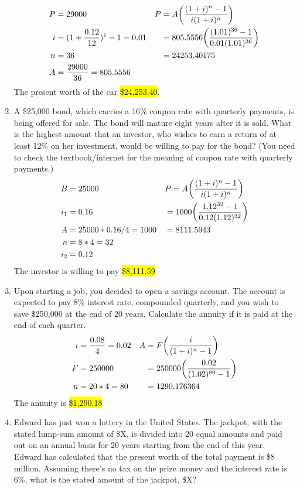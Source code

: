 \documentclass[12pt]{article}
\newcommand{\hilight}[1]{\colorbox{yellow}{#1}}
\begin{document}
\begin{enumerate}[label=\textbf{Q\arabic*}]
\begin{align*}
P &= 29000 &\vspace{20pt} P &= A\bigg (\frac{(1+i)^n-1}{i(1+i)^n}\bigg )\\
i &= (1+\frac{0.12}{12})^1 - 1= 0.01 & &= 805.5556\bigg ( \frac{(1.01)^{36}-1}{0.01(1.01)^{36}} \bigg )\\
n &= 36 & &= 24253.40175\\
A &= \frac{29000}{36} = 805.5556 & & \\
\end{align*}
The present worth of the car \hilight{\$24,253.40}.
\item A \$25,000 bond, which carries a 16\% coupon rate with quarterly payments, is being offered for sale. The bond will mature eight years after it is sold. What is the highest amount that an investor, who wishes to earn a return of at least 12\% on her investment, would be willing to pay for the bond? (You need to check the textbook/internet for the meaning of coupon rate with quarterly payments.)
\begin{align*}
B &= 25000 &\vspace{20pt} &P = A\bigg (\frac{(1+i)^n-1}{i(1+i)^n}\bigg )\\
i_1 &= 0.16 & &= 1000\bigg (\frac{1.12^{32}-1}{0.12(1.12)^{32}}\bigg )\\
A &= 25000 * 0.16/4 = 1000 & &=8111.5943\\
n &= 8*4 = 32 & & \\
i_2 &= 0.12 & &\\
\end{align*}
The investor is willing to pay \hilight{\$8,111.59}
\item Upon starting a job, you decided to open a savings account. The account is expected to pay 8\% interest rate, compounded quarterly, and you wish to save \$250,000 at the end of 20 years. Calculate the annuity if it is paid at the end of each quarter.
\begin{align*}
i &= \frac{0.08}{4} = 0.02 &\vspace{20pt} A&=F\bigg ( \frac{i}{(1+i)^n-1} \bigg ) \\
F &=250000 &\vspace{20pt} &=250000\bigg ( \frac{0.02}{(1.02)^{80}-1} \bigg ) \\
n &= 20*4 = 80 &\vspace{20pt} &= 1290.176364\\
\end{align*}
The annuity is \hilight{\$1,290.18} 
\item Edward has just won a lottery in the United States. The jackpot, with the stated lump-sum amount of \$X, is divided into 20 equal amounts and paid out on an annual basis for 20 years starting from the end of this year. Edward has calculated that the present worth of the total payment is \$8 million. Assuming there’s no tax on the prize money and the interest rate is 6\%, what is the stated amount of the jackpot, \$X?

\end{enumerate}
\end{document}
